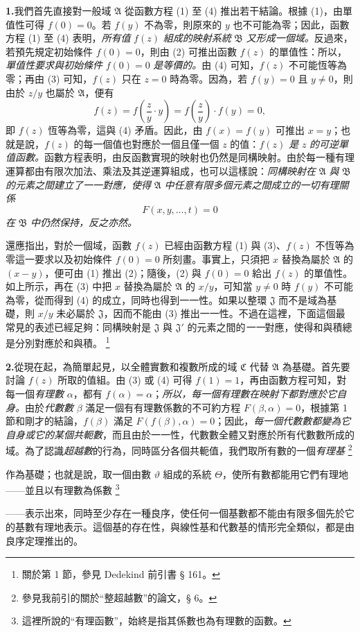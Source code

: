\documentclass[11pt]{article}
\providecommand{\qtext}[1]{“#1”}
\providecommand{\Afield}{\mathfrak A}
\providecommand{\Bfield}{\mathfrak B}
\providecommand{\Cfield}{\mathfrak C}
\providecommand{\Jdom}{\mathfrak J}
\providecommand{\srcfn}[2]{%
  \begingroup\renewcommand{\thefootnote}{#1}\footnote{#2}\addtocounter{footnote}{-1}\endgroup}
\begin{document}
\medskip
\noindent\textbf{1.}\quad 我們首先直接對一般域 \(\Afield\) 從函數方程 (1) 至 (4) 推出若干結論。根據 (1)，由單值性可得 \(f(0)=0\)。若 \(f(y)\) 不為零，則原來的 \(y\) 也不可能為零；因此，函數方程 (1) 至 (4) 表明，\emph{所有值} \(f(z)\) \emph{組成的映射系統} \(\Bfield\) \emph{又形成一個域。}反過來，若預先規定初始條件 \(f(0)=0\)，則由 (2) 可推出函數 \(f(z)\) 的單值性：所以，\emph{單值性要求與初始條件} \(f(0)=0\) \emph{是等價的。}由 (4) 可知，\(f(z)\) 不可能恆等為零；再由 (3) 可知，\(f(z)\) 只在 \(z=0\) 時為零。因為，若 \(f(y)=0\) 且 \(y\ne0\)，則由於 \(z/y\) 也屬於 \(\Afield\)，便有
\[
f(z)=f\!\left(\frac{z}{y}\cdot y\right)=f\!\left(\frac{z}{y}\right)\cdot f(y)=0,
\]
即 \(f(z)\) 恆等為零，這與 (4) 矛盾。因此，由 \(f(x)=f(y)\) 可推出 \(x=y\)；也就是說，\(f(z)\) 的每一個值也對應於一個且僅一個 \(z\) 的值：\emph{\(f(z)\) 是} \(z\) \emph{的可逆單值函數。}函數方程表明，由反函數實現的映射也仍然是同構映射。由於每一種有理運算都由有限次加法、乘法及其逆運算組成，也可以這樣說：\emph{同構映射在} \(\Afield\) \emph{與} \(\Bfield\) \emph{的元素之間建立了一一對應，使得} \(\Afield\) \emph{中任意有限多個元素之間成立的一切有理關係}
\[
F(x,y,\ldots,t)=0
\]
\emph{在} \(\Bfield\) \emph{中仍然保持，反之亦然。}

還應指出，對於一個域，函數 \(f(z)\) 已經由函數方程 (1) 與 (3)、\(f(z)\) 不恆等為零這一要求以及初始條件 \(f(0)=0\) 所刻畫。事實上，只須把 \(x\) 替換為屬於 \(\Afield\) 的 \((x-y)\)，便可由 (1) 推出 (2)；隨後，(2) 與 \(f(0)=0\) 給出 \(f(z)\) 的單值性。如上所示，再在 (3) 中把 \(x\) 替換為屬於 \(\Afield\) 的 \(x/y\)，可知當 \(y\ne0\) 時 \(f(y)\) 不可能為零，從而得到 (4) 的成立，同時也得到一一性。如果以整環 \(\Jdom\) 而不是域為基礎，則 \(x/y\) 未必屬於 \(\Jdom\)，因而不能由 (3) 推出一一性。不過在這裡，下面這個最常見的表述已經足夠：同構映射是 \(\Jdom\) 與 \(\Jdom'\) 的元素之間的\emph{一一}對應，使得和與積總是分別對應於和與積。\srcfn{*)}{關於第 1 節，參見 Dedekind 前引書 § 161。}

\medskip
\noindent\textbf{2.}\quad 從現在起，為簡單起見，以全體實數和複數所成的域 \(\Cfield\) 代替 \(\Afield\) 為基礎。首先要討論 \(f(z)\) 所取的值組。由 (3) 或 (4) 可得 \(f(1)=1\)，再由函數方程可知，對每一個\emph{有理數} \(\alpha\)，都有 \(f(\alpha)=\alpha\)；\emph{所以，每一個有理數在映射下都對應於它自身。}由於\emph{代數數} \(\beta\) 滿足一個有有理數係數的不可約方程 \(F(\beta,\alpha)=0\)，根據第 1 節和剛才的結論，\(f(\beta)\) 滿足 \(F(f(\beta),\alpha)=0\)；因此，\emph{每一個代數數都變為它自身或它的某個共軛數}，而且由於一一性，代數數全體又對應於所有代數數所成的域。為了認識\emph{超越數}的行為，同時區分各個共軛值，我們取所有數的一個\emph{有理基}\srcfn{**)}{參見我前引的關於\qtext{整超越數}的論文，§ 6。}作為基礎；也就是說，取一個由數 \(\vartheta\) 組成的系統 \(\Theta\)，使所有數都能用它們有理地——並且以有理數為係數\srcfn{***)}{這裡所說的\qtext{有理函數}，始終是指其係數也為有理數的函數。}——表示出來，同時至少存在一種良序，使任何一個基數都不能由有限多個先於它的基數有理地表示。這個基的存在性，與線性基和代數基的情形完全類似，都是由良序定理推出的。
\end{document}
